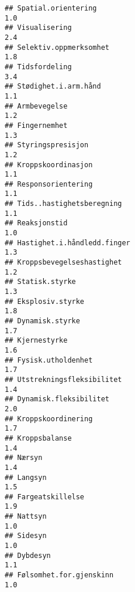 \documentclass[
]{article}
\begin{document}
\begin{verbatim}
## Spatial.orientering                                                              1.0
## Visualisering                                                                    2.4
## Selektiv.oppmerksomhet                                                           1.8
## Tidsfordeling                                                                    3.4
## Stødighet.i.arm.hånd                                                             1.1
## Armbevegelse                                                                     1.2
## Fingernemhet                                                                     1.3
## Styringspresisjon                                                                1.2
## Kroppskoordinasjon                                                               1.1
## Responsorientering                                                               1.1
## Tids..hastighetsberegning                                                        1.1
## Reaksjonstid                                                                     1.0
## Hastighet.i.håndledd.finger                                                      1.3
## Kroppsbevegelseshastighet                                                        1.2
## Statisk.styrke                                                                   1.3
## Eksplosiv.styrke                                                                 1.8
## Dynamisk.styrke                                                                  1.7
## Kjernestyrke                                                                     1.6
## Fysisk.utholdenhet                                                               1.7
## Utstrekningsfleksibilitet                                                        1.4
## Dynamisk.fleksibilitet                                                           2.0
## Kroppskoordinering                                                               1.7
## Kroppsbalanse                                                                    1.4
## Nærsyn                                                                           1.4
## Langsyn                                                                          1.5
## Fargeatskillelse                                                                 1.9
## Nattsyn                                                                          1.0
## Sidesyn                                                                          1.0
## Dybdesyn                                                                         1.1
## Følsomhet.for.gjenskinn                                                          1.0

\end{verbatim}
\end{document}
